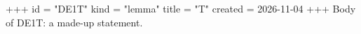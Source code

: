 +++
id = "DE1T"
kind = "lemma"
title = "T"
created = 2026-11-04
+++
Body of DE1T: a made-up statement.
